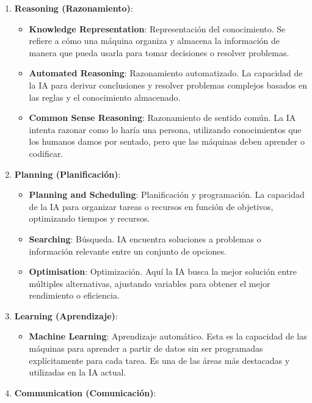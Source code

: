 \documentclass[
  10pt,
  letterpaper,
]{book}
\providecommand{\tightlist}{%
  \setlength{\itemsep}{0pt}\setlength{\parskip}{0pt}}\usepackage{longtable,booktabs,array}
\begin{document}
\begin{enumerate}
\def\labelenumi{\arabic{enumi}.}
\tightlist
\item
  \textbf{Reasoning (Razonamiento)}:

  \begin{itemize}
  \tightlist
  \item
    \textbf{Knowledge Representation}: Representación del conocimiento.
    Se refiere a cómo una máquina organiza y almacena la información de
    manera que pueda usarla para tomar decisiones o resolver problemas.
  \item
    \textbf{Automated Reasoning}: Razonamiento automatizado. La
    capacidad de la IA para derivar conclusiones y resolver problemas
    complejos basados en las reglas y el conocimiento almacenado.
  \item
    \textbf{Common Sense Reasoning}: Razonamiento de sentido común. La
    IA intenta razonar como lo haría una persona, utilizando
    conocimientos que los humanos damos por sentado, pero que las
    máquinas deben aprender o codificar.
  \end{itemize}
\item
  \textbf{Planning (Planificación)}:

  \begin{itemize}
  \tightlist
  \item
    \textbf{Planning and Scheduling}: Planificación y programación. La
    capacidad de la IA para organizar tareas o recursos en función de
    objetivos, optimizando tiempos y recursos.
  \item
    \textbf{Searching}: Búsqueda. IA encuentra soluciones a problemas o
    información relevante entre un conjunto de opciones.
  \item
    \textbf{Optimisation}: Optimización. Aquí la IA busca la mejor
    solución entre múltiples alternativas, ajustando variables para
    obtener el mejor rendimiento o eficiencia.
  \end{itemize}
\item
  \textbf{Learning (Aprendizaje)}:

  \begin{itemize}
  \tightlist
  \item
    \textbf{Machine Learning}: Aprendizaje automático. Esta es la
    capacidad de las máquinas para aprender a partir de datos sin ser
    programadas explícitamente para cada tarea. Es una de las áreas más
    destacadas y utilizadas en la IA actual.
  \end{itemize}
\item
  \textbf{Communication (Comunicación)}:


\end{enumerate}
\end{document}
